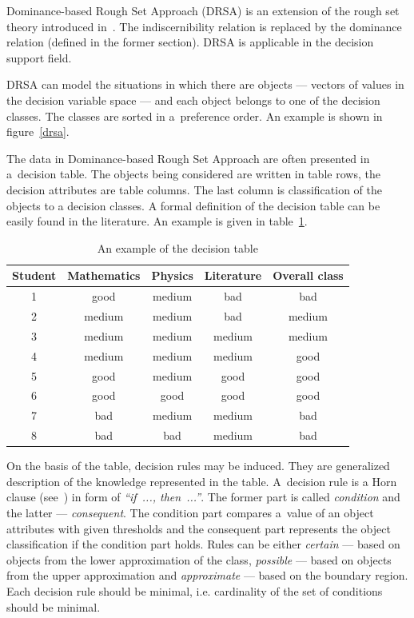 Dominance-based Rough Set Approach (DRSA) is an extension of the rough set
theory introduced in~\cite{GMS01, GMS02, GMS05}. The indiscernibility relation
is replaced by the dominance relation (defined in the former section). DRSA is
applicable in the decision support field.

DRSA can model the situations in which there are objects --- vectors of values
in the decision variable space --- and each object belongs to one of the
decision classes. The classes are sorted in a~preference order. An example is
shown in figure~\ref{drsa}.

The data in Dominance-based Rough Set Approach are often presented in
a~decision table. The objects being considered are written in table rows, the
decision attributes are table columns. The last column is classification of
the objects to a decision classes. A formal definition of the decision table
can be easily found in the literature. An example is given in
table~\ref{t:dec_tab-example}.

\begin{table}
  \centering
  \begin{tabular}{c c c c | c}
   \hline
   Student & Mathematics & Physics & Literature & Overall class \\
   \hline
   \hline
   1 & good & medium & bad & bad \\
   2 & medium & medium & bad & medium \\
   3 & medium & medium & medium & medium \\
   4 & medium & medium & medium & good \\
   5 & good & medium & good & good \\
   6 & good & good & good & good \\
   7 & bad & medium & medium & bad \\
   8 & bad & bad & medium & bad \\
   \hline
  \end{tabular}
  \caption{An example of the decision table}
  \label{t:dec_tab-example}
\end{table}

On the basis of the table, decision rules may be induced. They are generalized
description of the knowledge represented in the table. A~decision rule is a
Horn clause (see~\cite{Hor51}) in form of \textit{``if~..., then~...''}. The
former part is called \textit{condition} and the latter ---
\textit{consequent}. The condition part compares a~value of an object
attributes with given thresholds and the consequent part represents the object
classification if the condition part holds. Rules can be either
\textit{certain} --- based on objects from the lower approximation of the
class, \textit{possible} --- based on objects from the upper approximation and
\textit{approximate} --- based on the boundary region. Each decision rule
should be minimal, i.e. cardinality of the set of conditions should be
minimal.

